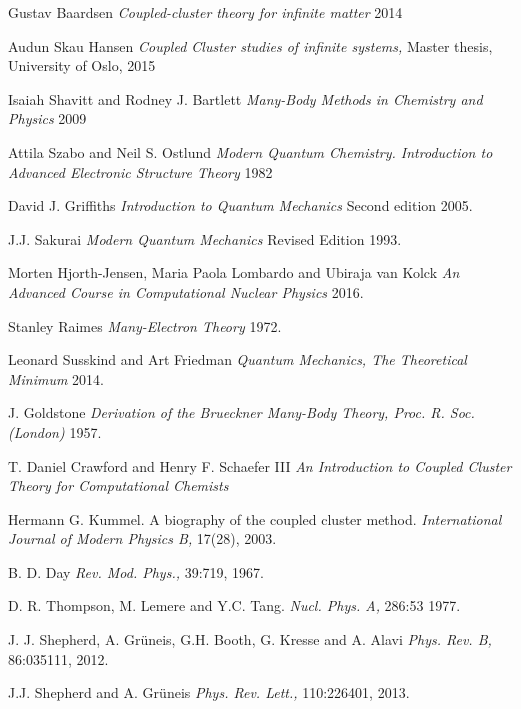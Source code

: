 \documentclass[twoside,english]{uiofysmaster}
\begin{document}
\begin{thebibliography}{9}

	Gustav Baardsen
	\textit{Coupled-cluster theory for infinite matter} 2014

	Audun Skau Hansen
	\textit{Coupled Cluster studies of infinite systems,} Master thesis, University of Oslo, 2015

	Isaiah Shavitt and Rodney J. Bartlett
	\textit{Many-Body Methods in Chemistry and Physics} 2009

	Attila Szabo and Neil S. Ostlund
	\textit{Modern Quantum Chemistry. Introduction to Advanced Electronic Structure Theory} 1982

	David J. Griffiths
	\textit{Introduction to Quantum Mechanics} Second edition 2005.

	J.J. Sakurai
	\textit{Modern Quantum Mechanics} Revised Edition 1993.

	Morten Hjorth-Jensen, Maria Paola Lombardo and Ubiraja van Kolck
	\textit{An Advanced Course in Computational Nuclear Physics} 2016.

	Stanley Raimes
	\textit{Many-Electron Theory} 1972.

	Leonard Susskind and Art Friedman
	\textit{Quantum Mechanics, The Theoretical Minimum} 2014.

	J. Goldstone
	\textit{Derivation of the Brueckner Many-Body Theory, Proc. R. Soc. (London)} 1957. 

	T. Daniel Crawford and Henry F. Schaefer III
	\textit{An Introduction to Coupled Cluster Theory for Computational Chemists} 

	Hermann G. Kummel. A biography of the coupled cluster method. 
	\textit{International Journal of Modern Physics B,} 17(28), 2003. 

	B. D. Day
	\textit{Rev. Mod. Phys.,}
	39:719, 1967.

	D. R. Thompson, M. Lemere and Y.C. Tang.
	\textit{Nucl. Phys. A,} 286:53 1977.

	J. J. Shepherd, A. Grüneis, G.H. Booth, G. Kresse and A. Alavi 
	\textit{Phys. Rev. B,} 86:035111, 2012.

	J.J. Shepherd and A. Grüneis
	\textit{Phys. Rev. Lett.,} 110:226401, 2013.


\end{thebibliography}
\end{document}

